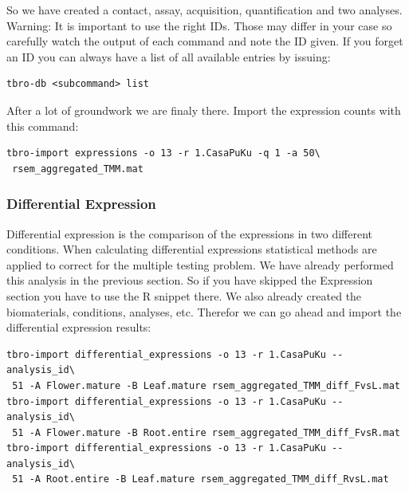 \documentclass[english]{scrartcl}
\begin{document}
So we have created a contact, assay, acquisition, quantification and two
analyses. Warning: It is important to use the right IDs. Those may differ in
your case so carefully watch the output of each command and note the ID given.
If you forget an ID you can always have a list of all available entries by
issuing:
\begin{lstlisting}
tbro-db <subcommand> list
\end{lstlisting}
After a lot of groundwork we are finaly there. Import the expression counts with
this command:
\begin{lstlisting}
tbro-import expressions -o 13 -r 1.CasaPuKu -q 1 -a 50\
 rsem_aggregated_TMM.mat
\end{lstlisting}

\subsubsection{Differential Expression}
Differential expression is the comparison of the expressions in two different
conditions. When calculating differential expressions statistical methods are
applied to correct for the multiple testing problem. We have already performed
this analysis in the previous section. So if you have skipped the Expression
section you have to use the R snippet there. We also already created the
biomaterials, conditions, analyses, etc. Therefor we can go ahead and import the
differential expression results:
\begin{lstlisting}
tbro-import differential_expressions -o 13 -r 1.CasaPuKu --analysis_id\
 51 -A Flower.mature -B Leaf.mature rsem_aggregated_TMM_diff_FvsL.mat
tbro-import differential_expressions -o 13 -r 1.CasaPuKu --analysis_id\
 51 -A Flower.mature -B Root.entire rsem_aggregated_TMM_diff_FvsR.mat
tbro-import differential_expressions -o 13 -r 1.CasaPuKu --analysis_id\
 51 -A Root.entire -B Leaf.mature rsem_aggregated_TMM_diff_RvsL.mat
\end{lstlisting}
\end{document}
